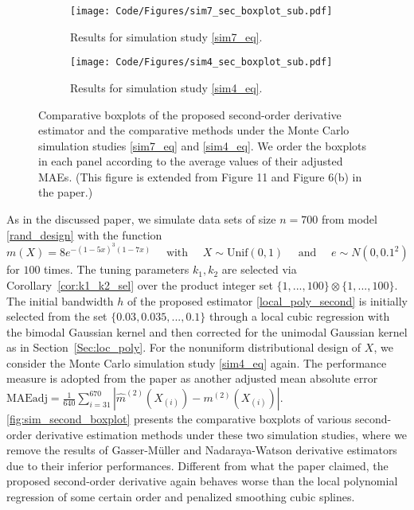 \documentclass{uwstat572}
\theoremstyle{definition}
\renewcommand{\hat}{\widehat}
\theoremstyle{theorem}
\begin{document}
\begin{figure}
	\captionsetup[subfigure]{justification=centering}
	\begin{subfigure}[t]{0.49\linewidth}
		\centering
		\texttt{[image: Code/Figures/sim7\_sec\_boxplot\_sub.pdf]}
		\caption{Results for simulation study \eqref{sim7_eq}.}
	\end{subfigure}
	\hfil
	\begin{subfigure}[t]{0.49\linewidth}
		\centering
		\texttt{[image: Code/Figures/sim4\_sec\_boxplot\_sub.pdf]}
		\caption{Results for simulation study \eqref{sim4_eq}.}
	\end{subfigure}
	\caption{Comparative boxplots of the proposed second-order derivative estimator and the comparative methods under the Monte Carlo simulation studies \eqref{sim7_eq} and \eqref{sim4_eq}. We order the boxplots in each panel according to the average values of their adjusted MAEs. (This figure is extended from Figure 11 and Figure 6(b) in the paper.)}
	\label{fig:sim_second_boxplot}
\end{figure}

As in the discussed paper, we simulate data sets of size $n=700$ from model \eqref{rand_design} with the function
\begin{equation}
\label{sim7_eq}
m(X) = 8e^{-(1-5x)^3(1-7x)} \quad \text{ with } \quad X\sim \mathrm{Unif}(0,1) \quad \text{ and } \quad e\sim N(0,0.1^2)
\end{equation}
for $100$ times. The tuning parameters $k_1,k_2$ are selected via Corollary~\ref{cor:k1_k2_sel} over the product integer set $\{1,...,100\} \otimes \{1,...,100\}$. The initial bandwidth $h$ of the proposed estimator \eqref{local_poly_second} is initially selected from the set $\{0.03, 0.035,...,0.1\}$ through a local cubic regression with the bimodal Gaussian kernel and then corrected for the unimodal Gaussian kernel as in Section~\ref{Sec:loc_poly}. For the nonuniform distributional design of $X$, we consider the Monte Carlo simulation study \eqref{sim4_eq} again. The performance measure is adopted from the paper as another adjusted mean absolute error $\text{MAEadj}=\frac{1}{640}\sum_{i=31}^{670} \left|\hat{m}^{(2)}(X_{(i)}) - m^{(2)}(X_{(i)}) \right|$. \autoref{fig:sim_second_boxplot} presents the comparative boxplots of various second-order derivative estimation methods under these two simulation studies, where we remove the results of Gasser-M\"uller and Nadaraya-Watson derivative estimators due to their inferior performances. Different from what the paper claimed, the proposed second-order derivative again behaves worse than the local polynomial regression of some certain order and penalized smoothing cubic splines.
\end{document}
